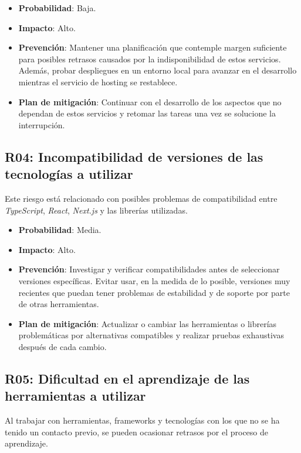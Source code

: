 \begin{itemize}
    \item \textbf{Probabilidad}: Baja.
    \item \textbf{Impacto}: Alto.
    \item \textbf{Prevención}: Mantener una planificación que contemple margen suficiente para posibles retrasos causados por la indisponibilidad de estos servicios. Además, probar despliegues en un entorno local para avanzar en el desarrollo mientras el servicio de hosting se restablece.
    \item \textbf{Plan de mitigación}: Continuar con el desarrollo de los aspectos que no dependan de estos servicios y retomar las tareas una vez se solucione la interrupción.
\end{itemize}

\subsection*{R04: Incompatibilidad de versiones de las tecnologías a utilizar}
Este riesgo está relacionado con posibles problemas de compatibilidad entre \textit{TypeScript}, \textit{React}, \textit{Next.js} y las librerías utilizadas.

\begin{itemize}
    \item \textbf{Probabilidad}: Media.
    \item \textbf{Impacto}: Alto.
    \item \textbf{Prevención}: Investigar y verificar compatibilidades antes de seleccionar versiones específicas. Evitar usar, en la medida de lo posible, versiones muy recientes que puedan tener problemas de estabilidad y de soporte por parte de otras herramientas.
    \item \textbf{Plan de mitigación}: Actualizar o cambiar las herramientas o librerías problemáticas por alternativas compatibles y realizar pruebas exhaustivas después de cada cambio.
\end{itemize}

\subsection*{R05: Dificultad en el aprendizaje de las herramientas a utilizar}
Al trabajar con herramientas, frameworks y tecnologías con los que no se ha tenido un contacto previo, se pueden ocasionar retrasos por el proceso de aprendizaje.

